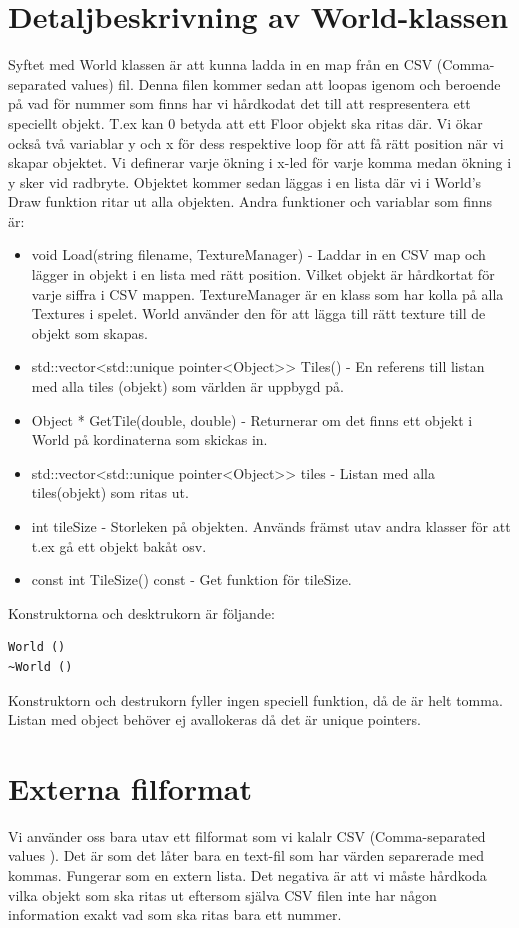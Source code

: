 \documentclass{template}
\begin{document}
\newpage
\section{Detaljbeskrivning av World-klassen}
Syftet med World klassen är att kunna ladda in en map från en CSV (Comma-separated values) fil. Denna filen kommer sedan att loopas igenom och beroende på vad för nummer som finns har vi hårdkodat det till att respresentera ett speciellt objekt. T.ex kan 0 betyda att ett Floor objekt ska ritas där. Vi ökar också två variablar y och x för dess respektive loop för att få rätt position när vi skapar objektet. Vi definerar varje ökning i x-led för varje komma medan ökning i y sker vid radbryte. Objektet kommer sedan läggas i en lista där vi i World's Draw funktion ritar ut alla objekten. Andra funktioner och variablar som finns är:
\begin{itemize}
\item void Load(string filename, TextureManager) - Laddar in en CSV map och lägger in objekt i en lista med rätt position. Vilket objekt är hårdkortat för varje siffra i CSV mappen. TextureManager är en klass som har kolla på alla Textures i spelet. World använder den för att lägga till rätt texture till de objekt som skapas.
\item std::vector<std::unique pointer<Object>> Tiles() - En referens till listan med alla tiles (objekt) som världen är uppbygd på.
\item Object * GetTile(double, double) - Returnerar om det finns ett objekt i World på kordinaterna som skickas in.
\item std::vector<std::unique pointer<Object>> tiles - Listan med alla tiles(objekt) som ritas ut. 
\item int tileSize - Storleken på objekten. Används främst utav andra klasser för att t.ex gå ett objekt bakåt osv.
\item const int TileSize() const - Get funktion för tileSize.
\end{itemize}

{\setlength{\parindent}{0cm}
Konstruktorna och desktrukorn är följande:
}

\begin{verbatim}
World ()
~World ()
\end{verbatim}
Konstruktorn och destrukorn fyller ingen speciell funktion, då de är helt tomma. Listan med object behöver ej avallokeras då det är unique pointers.

\newpage
\section{Externa filformat}
Vi använder oss bara utav ett filformat som vi kalalr CSV (Comma-separated values
). Det är som det låter bara en text-fil som har värden separerade med kommas. Fungerar som en extern lista. Det negativa är att vi måste hårdkoda vilka objekt som ska ritas ut eftersom själva CSV filen inte har någon information exakt vad som ska ritas bara ett nummer. 
\end{document}
